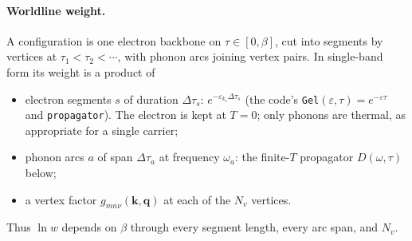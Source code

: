 \documentclass[11pt]{article}
\newcommand{\kv}{\mathbf{k}}
\newcommand{\qv}{\mathbf{q}}
\begin{document}
\paragraph{Worldline weight.}
A configuration is one electron backbone on $\tau\in[0,\beta]$, cut into segments by
vertices at $\tau_{1}<\tau_{2}<\cdots$, with phonon arcs joining vertex pairs. In
single-band form its weight is a product of
\begin{itemize}
  \item electron segments $s$ of duration $\Delta\tau_{s}$: $e^{-\varepsilon_{k_{s}}\Delta\tau_{s}}$
    (the code's \texttt{Gel}$(\varepsilon,\tau)=e^{-\varepsilon\tau}$ and \texttt{propagator}).
    The electron is kept at $T=0$; only phonons are thermal, as appropriate for a single carrier;
  \item phonon arcs $a$ of span $\Delta\tau_{a}$ at frequency $\omega_{a}$: the finite-$T$
    propagator $D(\omega,\tau)$ below;
  \item a vertex factor $g_{mn\nu}(\kv,\qv)$ at each of the $N_{v}$ vertices.
\end{itemize}
Thus $\ln w$ depends on $\beta$ through every segment length, every arc span, and $N_{v}$.
\end{document}
